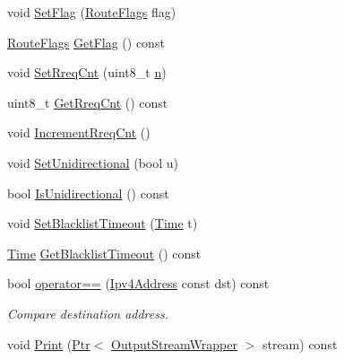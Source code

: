 \begin{DoxyCompactItemize}
\item 
void \hyperlink{classns3_1_1aodv_1_1RoutingTableEntry_aedae6828855a77add2776428ce7ce524}{Set\+Flag} (\hyperlink{group__aodv_ga44216921a9c725a5ab8bc19059052a26}{Route\+Flags} flag)
\item 
\hyperlink{group__aodv_ga44216921a9c725a5ab8bc19059052a26}{Route\+Flags} \hyperlink{classns3_1_1aodv_1_1RoutingTableEntry_a429dbfa568c5ac608ee60933e51e0f01}{Get\+Flag} () const 
\item 
void \hyperlink{classns3_1_1aodv_1_1RoutingTableEntry_a804958de54616b74ed7f3fe83de05340}{Set\+Rreq\+Cnt} (uint8\+\_\+t \hyperlink{lte__link__budget__x2__handover__measures_8m_abdb05bc5a064cf642a06c83b3392f148}{n})
\item 
uint8\+\_\+t \hyperlink{classns3_1_1aodv_1_1RoutingTableEntry_a31a953b547e8a2a9015cff7aea8d87a9}{Get\+Rreq\+Cnt} () const 
\item 
void \hyperlink{classns3_1_1aodv_1_1RoutingTableEntry_a74410d49e8da4e9a3d2ca137fcfdc139}{Increment\+Rreq\+Cnt} ()
\item 
void \hyperlink{classns3_1_1aodv_1_1RoutingTableEntry_ae628e642695b5b659c19f8cd4cf4fd8d}{Set\+Unidirectional} (bool u)
\item 
bool \hyperlink{classns3_1_1aodv_1_1RoutingTableEntry_a88aea9f5355b20fcc419381681624b0b}{Is\+Unidirectional} () const 
\item 
void \hyperlink{classns3_1_1aodv_1_1RoutingTableEntry_a6adafc28d0c4558a933817fb9057c54a}{Set\+Blacklist\+Timeout} (\hyperlink{classns3_1_1Time}{Time} t)
\item 
\hyperlink{classns3_1_1Time}{Time} \hyperlink{classns3_1_1aodv_1_1RoutingTableEntry_a0de85e255ae4d7815e38c61a5ac88ab6}{Get\+Blacklist\+Timeout} () const 
\item 
bool \hyperlink{classns3_1_1aodv_1_1RoutingTableEntry_af7139e71d723bee9930d2083105effd5}{operator==} (\hyperlink{classns3_1_1Ipv4Address}{Ipv4\+Address} const dst) const 
\begin{DoxyCompactList}\small\item\em Compare destination address. \end{DoxyCompactList}\item 
void \hyperlink{classns3_1_1aodv_1_1RoutingTableEntry_abe0a4cb20972ee53d3d6032e3af42d8a}{Print} (\hyperlink{classns3_1_1Ptr}{Ptr}$<$ \hyperlink{classns3_1_1OutputStreamWrapper}{Output\+Stream\+Wrapper} $>$ stream) const 
\end{DoxyCompactItemize}

